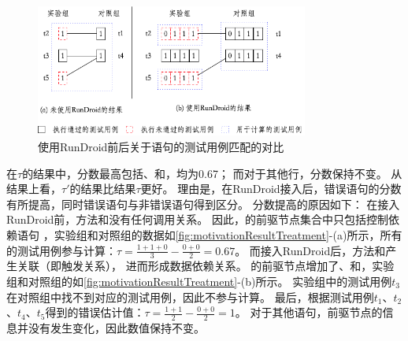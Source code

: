 \begin{figure}[!h]
	\begin{center}
		\includegraphics[width=0.8\textwidth]{./Figures/treatment.png}
	\end{center}
	\caption{使用RunDroid前后关于语句的测试用例匹配的对比}
	\label{fig:motivationResultTreatment}
\end{figure}

在$\tau$的结果中，分数最高包括、和，均为0.67；
而对于其他行，分数保持不变。
从结果上看，$\tau'$的结果比结果$\tau$更好。
理由是，在RunDroid接入后，错误语句的分数有所提高，同时错误语句与非错误语句得到区分。
 分数提高的原因如下：
在接入RunDroid前，方法和没有任何调用关系。
因此，的前驱节点集合中只包括控制依赖语句 ，实验组和对照组的数据如\autoref{fig:motivationResultTreatment}-(a)所示，所有的测试用例参与计算：$\tau= \frac{1+1+0	}{3} - \frac{0+0}{2} = 0.67$。
而接入RunDroid后，方法和产生关联（即触发关系），
进而形成数据依赖关系。
的前驱节点增加了、和，实验组和对照组的如\autoref{fig:motivationResultTreatment}-(b)所示。
实验组中的测试用例$t_3$在对照组中找不到对应的测试用例，因此不参与计算。
最后，根据测试用例$t_1$、$t_2$、$t_4$、$t_5$得到的错误估计值：$\tau =  \frac{1+1	}{2} - \frac{0+0}{2} = 1$。
对于其他语句，前驱节点的信息并没有发生变化，因此数值保持不变。



